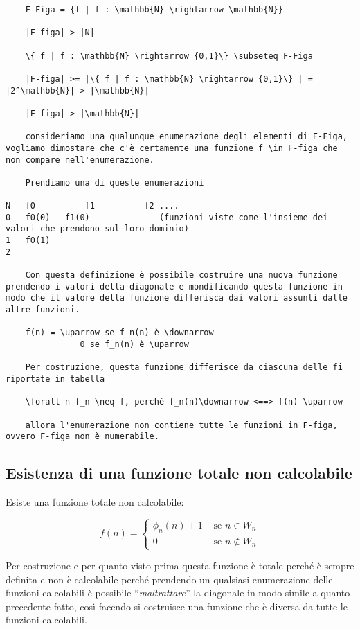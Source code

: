 \begin{verbatim}
	F-Figa = {f | f : \mathbb{N} \rightarrow \mathbb{N}}
	
	|F-figa| > |N|
	
	\{ f | f : \mathbb{N} \rightarrow {0,1}\} \subseteq F-Figa
	
	|F-figa| >= |\{ f | f : \mathbb{N} \rightarrow {0,1}\} | = |2^\mathbb{N}| > |\mathbb{N}|
	
	|F-figa| > |\mathbb{N}|
	
	consideriamo una qualunque enumerazione degli elementi di F-Figa, vogliamo dimostare che c'è certamente una funzione f \in F-figa che non compare nell'enumerazione.
	
	Prendiamo una di queste enumerazioni
	
N	f0 			f1 			f2 .... 
0	f0(0)	f1(0)              (funzioni viste come l'insieme dei valori che prendono sul loro dominio)
1	f0(1)
2

	Con questa definizione è possibile costruire una nuova funzione prendendo i valori della diagonale e mondificando questa funzione in modo che il valore della funzione differisca dai valori assunti dalle altre funzioni.
	
	f(n) = \uparrow se f_n(n) è \downarrow
	           0 se f_n(n) è \uparrow
	           
	Per costruzione, questa funzione differisce da ciascuna delle fi riportate in tabella
	
	\forall n f_n \neq f, perché f_n(n)\downarrow <==> f(n) \uparrow
	
	allora l'enumerazione non contiene tutte le funzioni in F-figa, ovvero F-figa non è numerabile.
\end{verbatim}

\subsection{Esistenza di una funzione totale non calcolabile}

Esiste una funzione totale non calcolabile:

$$
f(n) = \begin{cases}
\phi_n(n) +1 &\text{ se } n \in W_n \\
0 &\text{ se } n \notin W_n
\end{cases}
$$

Per costruzione e per quanto visto prima questa funzione è totale perché è sempre definita e non è calcolabile perché prendendo un qualsiasi enumerazione delle funzioni calcolabili è possibile ``\textit{maltrattare}'' la diagonale in modo simile a quanto precedente fatto, così facendo si costruisce una funzione che è diversa da tutte le funzioni calcolabili.

